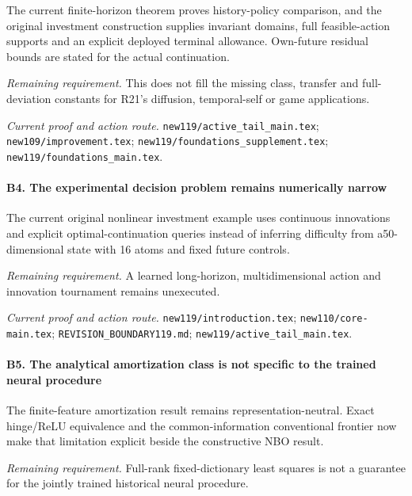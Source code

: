 The current finite-horizon theorem proves history-policy comparison, and the original investment construction supplies invariant domains, full feasible-action supports and an explicit deployed terminal allowance. Own-future residual bounds are stated for the actual continuation.

\par\emph{Remaining requirement.} This does not fill the missing class, transfer and full-deviation constants for R21's diffusion, temporal-self or game applications.

\par\emph{Current proof and action route.} \nolinkurl{new119/active_tail_main.tex}; \nolinkurl{new109/improvement.tex}; \nolinkurl{new119/foundations_supplement.tex}; \nolinkurl{new119/foundations_main.tex}.

\paragraph{B4. The experimental decision problem remains numerically narrow}

The current original nonlinear investment example uses continuous innovations and explicit optimal-continuation queries instead of inferring difficulty from a50-dimensional state with 16 atoms and fixed future controls.

\par\emph{Remaining requirement.} A learned long-horizon, multidimensional action and innovation tournament remains unexecuted.

\par\emph{Current proof and action route.} \nolinkurl{new119/introduction.tex}; \nolinkurl{new110/core-main.tex}; \nolinkurl{REVISION_BOUNDARY119.md}; \nolinkurl{new119/active_tail_main.tex}.

\paragraph{B5. The analytical amortization class is not specific to the trained neural procedure}

The finite-feature amortization result remains representation-neutral. Exact hinge/\allowbreak{}ReLU equivalence and the common-information conventional frontier now make that limitation explicit beside the constructive NBO result.

\par\emph{Remaining requirement.} Full-rank fixed-dictionary least squares is not a guarantee for the jointly trained historical neural procedure.

